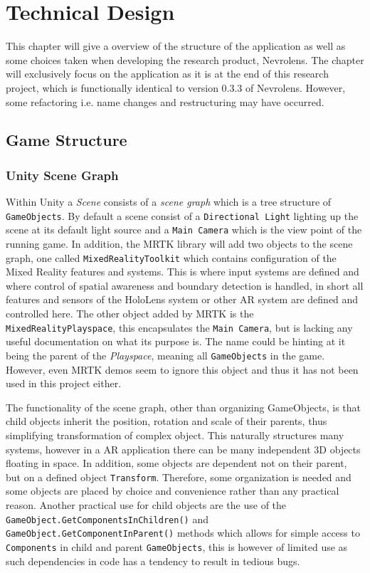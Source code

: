\chapter{Technical Design}

This chapter will give a overview of the structure of the application as well as some choices taken when developing the research product, Nevrolens. The chapter will exclusively focus on the application as it is at the end of this research project, which is functionally identical to version 0.3.3 of Nevrolens. However, some refactoring i.e. name changes and restructuring may have occurred. 

\section{Game Structure}

\subsection*{Unity Scene Graph}

Within Unity a \textit{Scene} consists of a \textit{scene graph} which is a tree structure of \texttt{GameObjects}. By default a scene consist of a \texttt{Directional Light} lighting up the scene at its default light source and a \texttt{Main Camera} which is the view point of the running game. In addition, the MRTK library will add two objects to the scene graph, one called \texttt{MixedRealityToolkit} which contains configuration of the Mixed Reality features and systems. This is where input systems are defined and where control of spatial awareness and boundary detection is handled, in short all features and sensors of the HoloLens system or other AR system are defined and controlled here. The other object added by MRTK is the \texttt{MixedRealityPlayspace}, this encapsulates the \texttt{Main Camera}, but is lacking any useful documentation on what its purpose is. The name could be hinting at it being the parent of the \textit{Playspace}, meaning all \texttt{GameObjects} in the game. However, even MRTK demos seem to ignore this object and thus it has not been used in this project either.

The functionality of the scene graph, other than organizing GameObjects, is that child objects inherit the position, rotation and scale of their parents, thus simplifying transformation of complex object. This naturally structures many systems, however in a AR application there can be many independent 3D objects floating in space. In addition, some objects are dependent not on their parent, but on a defined object \texttt{Transform}. Therefore, some organization is needed and some objects are placed by choice and convenience rather than any practical reason. Another practical use for child objects are the use of the \texttt{GameObject.GetComponentsInChildren()} and \texttt{GameObject.GetComponentInParent()} methods which allows for simple access to \texttt{Components} in child and parent \texttt{GameObjects}, this is however of limited use as such dependencies in code has a tendency to result in tedious bugs.

